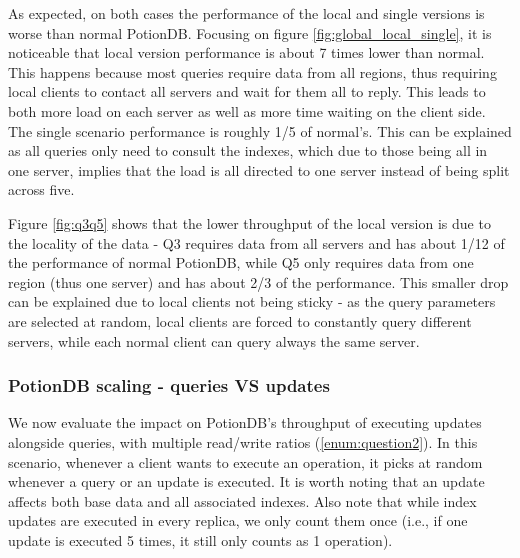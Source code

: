 \documentclass{vldb}
\begin{document}
As expected, on both cases the performance of the local and single versions is worse than normal PotionDB.
Focusing on figure \ref{fig:global_local_single}, it is noticeable that local version performance is about 7 times lower than normal.
This happens because most queries require data from all regions, thus requiring local clients to contact all servers and wait for them all to reply.
This leads to both more load on each server as well as more time waiting on the client side.
The single scenario performance is roughly 1/5 of normal's.
This can be explained as all queries only need to consult the indexes, which due to those being all in one server, implies that the load is all directed to one server instead of being split across five.

Figure \ref{fig:q3q5} shows that the lower throughput of the local version is due to the locality of the data - Q3 requires data from all servers and has about 1/12 of the performance of normal PotionDB, while Q5 only requires data from one region (thus one server) and has about 2/3 of the performance.
This smaller drop can be explained due to local clients not being sticky - as the query parameters are selected at random, local clients are forced to constantly query different servers, while each normal client can query always the same server.

\subsubsection{PotionDB scaling - queries VS updates}

We now evaluate the impact on PotionDB's throughput of executing updates alongside queries, with multiple read/write ratios (\ref{enum:question2}).
In this scenario, whenever a client wants to execute an operation, it picks at random whenever a query or an update is executed.
It is worth noting that an update affects both base data and all associated indexes.
Also note that while index updates are executed in every replica, we only count them once (i.e., if one update is executed 5 times, it still only counts as 1 operation).
\end{document}
